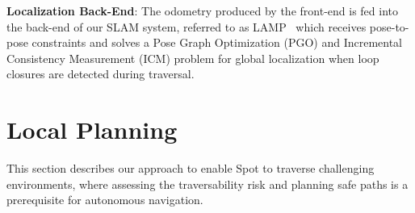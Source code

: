 \documentclass[letterpaper, 10pt, conference]{ieeeconf}      %
\newcommand{\ph}[1]{{\textbf{#1}:}} %
\newcommand{\rev}[1]{{\color{blue}#1}} %
\begin{document}

\ph{Localization Back-End} The odometry produced by the front-end is fed into the back-end of our SLAM system, referred to as LAMP~\cite{Ebadi2020} which receives pose-to-pose constraints and solves a Pose Graph Optimization (PGO) and Incremental Consistency Measurement (ICM) problem for global localization when loop closures are detected during traversal. 



\section{Local Planning}\label{sec:local_planning}
This section describes our approach to enable Spot to traverse challenging environments, where assessing the traversability risk and planning safe paths is a prerequisite for autonomous navigation.


\end{document}

